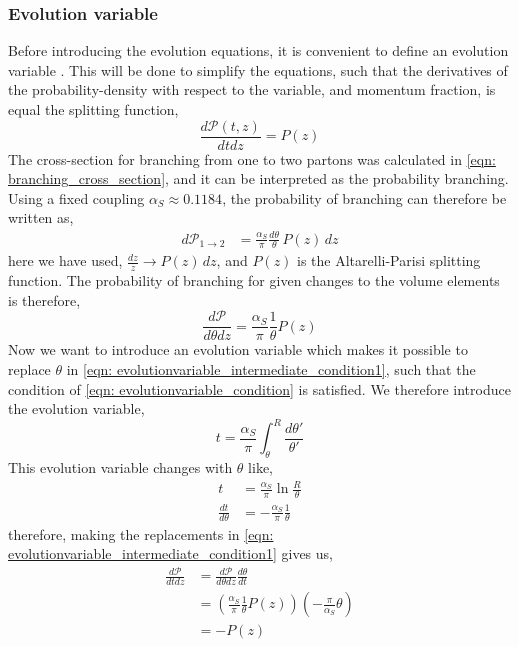 \documentclass[main.tex]{subfiles}
\begin{document}
\subsubsection*{Evolution variable}
Before introducing the evolution equations, it is convenient to define an evolution variable \cite{Dasgupta_2015}. This will be done to simplify the equations, such that the derivatives of the probability-density with respect to the variable, and momentum fraction, is equal the splitting function, 
\begin{equation}\label{eqn: evolutionvariable_condition}
    \frac{d \mathcal{P}(t,z)}{dt dz} = P(z)
\end{equation}
The cross-section for branching from one to two partons was calculated in \autoref{eqn: branching_cross_section}, and it can be interpreted as the probability branching. Using a fixed coupling \(\alpha_S \approx 0.1184\), the probability of branching can therefore be written as,
\begin{align}
    d\mathcal{P}_{1\rightarrow 2} &= \frac{\alpha_S}{\pi} \frac{d\theta}{\theta} \, P(z)\, dz
\end{align}
here we have used, \(\frac{dz}{z} \rightarrow P(z)\, dz\), and \(P(z)\) is the Altarelli-Parisi splitting function. The probability of branching for given changes to the volume elements is therefore,
\begin{equation}\label{eqn: evolutionvariable_intermediate_condition1}
    \frac{d\mathcal{P}}{d\theta dz} = \frac{\alpha_S}{\pi} \frac{1}{\theta} P(z)
\end{equation}
Now we want to introduce an evolution variable which makes it possible to replace \(\theta\) in \autoref{eqn: evolutionvariable_intermediate_condition1}, such that the condition of \autoref{eqn: evolutionvariable_condition} is satisfied.
We therefore introduce the evolution variable,
\begin{equation}\label{eqn: evolution_variable_vacuum}
    t = \frac{\alpha_S}{\pi} \int_{\theta}^{R} \frac{d\theta'}{\theta'}
\end{equation}
This evolution variable changes with \(\theta\) like,
\begin{align} 
    t&= \frac{\alpha_S}{\pi} \ln \frac{R}{\theta} \nonumber \\
    \frac{dt}{d\theta} &= - \frac{\alpha_S}{\pi} \frac{1}{\theta}
\end{align}
therefore, making the replacements in \autoref{eqn: evolutionvariable_intermediate_condition1} gives us,
\begin{align}
     \frac{d\mathcal{P}}{dt dz} &= \frac{d\mathcal{P}}{d\theta dz} \frac{d\theta}{dt} \nonumber\\
    &= \left( \frac{\alpha_S}{\pi} \frac{1}{\theta} P(z) \right) \left( -\frac{\pi}{\alpha_S} \theta \right) \nonumber \\
    &= -P(z)
\end{align}
\end{document}

